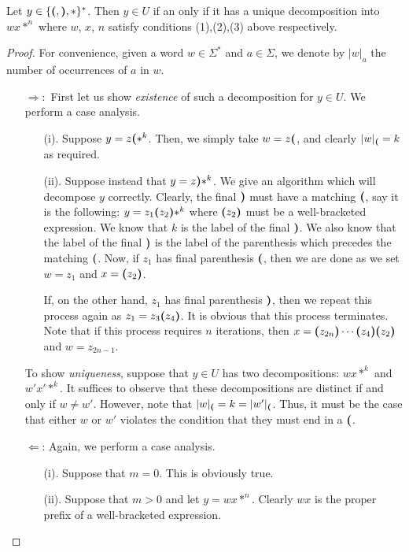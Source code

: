 \begin{proposition}\label{prop:decompu} Let $y \in \{{\sf \textbf{(}}, {\sf \textbf{)}}, *\}^*$. Then $y \in U$ if
an only if it has a unique decomposition into $wx*^n$ where $w$, $x$, $n$ satisfy
conditions (1),(2),(3) above respectively.
\end{proposition}

\begin{proof}For convenience, given a word $w \in \Sigma^*$ and $a \in \Sigma$, we
denote by $|w|_a$ the number of occurrences of $a$ in $w$.
\begin{itemize}
\item[${\Rightarrow}:$]  First let us show \emph{existence} of such a
decomposition for $y \in U$. We perform a case analysis.
\begin{enumerate}
\item[(i).] Suppose $y = z{\sf \textbf{(}} *^k$. Then, we simply take $w =
z{\sf \textbf{(}}$, and clearly $|w|_{{\sf \textbf{(}}} = k$ as required. \item[(ii).]
Suppose instead that $y = z{\sf \textbf{)}} *^k$. We give an algorithm which
will decompose $y$ correctly. Clearly, the final ${\sf \textbf{)}}$ must have a
matching ${\sf \textbf{(}}$, say it is the following: $y = z_1 {\sf \textbf{(}} z_2 {\sf \textbf{)}} *^k$
where ${\sf \textbf{(}} z_2{\sf \textbf{)}}$ must be a well-bracketed expression. We know
that $k$ is the label of the final ${\sf \textbf{)}}$. We also know that the
label of the final ${\sf \textbf{)}}$ is the label of the parenthesis which
precedes the matching ${\sf \textbf{(}} $. Now, if $z_1$ has final parenthesis
${\sf \textbf{(}}$, then we are done as we set $w = z_1$ and $x = {\sf \textbf{(}} z_2 {\sf \textbf{)}}$.

If, on the other hand, $z_1$ has final parenthesis ${\sf \textbf{)}}$, then we
repeat this process again as $z_1 = z_3 {\sf \textbf{(}} z_4 {\sf \textbf{)}}$. It is
obvious that this process terminates. Note that if this process
requires $n$ iterations, then $x = {\sf \textbf{(}} z_{2n} {\sf \textbf{)}} \cdots {\sf \textbf{(}} z_4
{\sf \textbf{)}} {\sf \textbf{(}} z_2 {\sf \textbf{)}}$ and $w = z_{2n-1}$.
\end{enumerate}
To show \emph{uniqueness}, suppose that $y \in U$ has two
decompositions: $wx *^k$ and $w' x' *^k$. It suffices to observe
that these decompositions are distinct if and only if $w \not =
w'$. However, note that $|w|_{{\sf \textbf{(}} } = k = |w'|_{{\sf \textbf{(}} }$. Thus, it
must be the case that either $w$ or $w'$ violates the condition
that they must end in a ${\sf \textbf{(}} $.

\item[$\Leftarrow$:]
Again, we perform a case analysis.
\begin{enumerate}
\item[(i).] Suppose that $m=0$. This is obviously true.
\item[(ii).] Suppose that $m>0$ and let $y = w x *^n$. Clearly
$wx$ is the proper prefix of a well-bracketed
expression.


\end{enumerate}
\end{itemize}
\end{proof}
